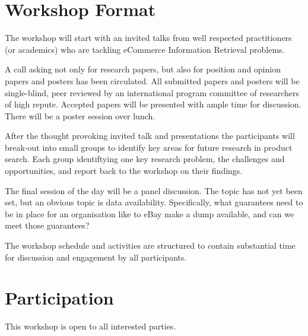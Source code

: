 \documentclass[sigconf]{acmart}
\begin{document}
\section{Workshop Format}

The workshop will start with an invited talks from  well respected
practitioners (or academics) who are tackling eCommerce Information Retrieval problems.

A call asking not only for research papers, but also for position and opinion papers and posters
has been circulated.  All submitted papers and posters will be single-blind, peer reviewed by an
international program committee of researchers of high repute.  Accepted
papers will be presented with ample time for discussion.  There will be a poster session over lunch.

After the thought provoking invited talk and presentations the participants
will break-out into small groups to identify key areas for future
research in product search. Each group identiftying one key research
problem, the challenges and opportunities, and report back to the
workshop on their findings.

The final session of the day will be a panel discussion.  The topic has
not yet been set, but an obvious topic is data availability.
Specifically, what guarantees need to be in place for an organisation
like to eBay make a dump available, and can we meet those guarantees?

The workshop schedule and activities are structured to contain
substantial time for discussion and engagement by all participants.

\section{Participation}
This workshop is open to all interested parties.
\end{document}
